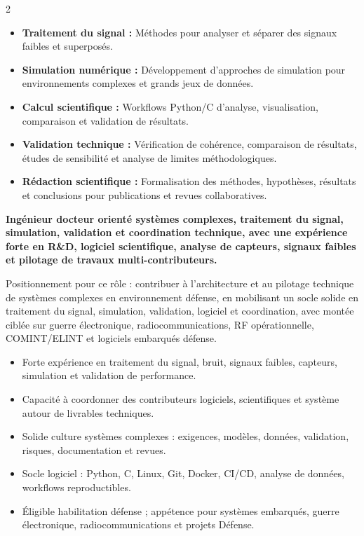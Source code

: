 \documentclass[8pt,a4paper,ragged2e,withhyper]{altacv}
\begin{document}
\begin{paracol}{2}
\begin{itemize}
  \item \textbf{Traitement du signal :} Méthodes pour analyser et séparer des signaux faibles et superposés.
  \item \textbf{Simulation numérique :} Développement d’approches de simulation pour environnements complexes et grands jeux de données.
  \item \textbf{Calcul scientifique :} Workflows Python/C d’analyse, visualisation, comparaison et validation de résultats.
  \item \textbf{Validation technique :} Vérification de cohérence, comparaison de résultats, études de sensibilité et analyse de limites méthodologiques.
  \item \textbf{Rédaction scientifique :} Formalisation des méthodes, hypothèses, résultats et conclusions pour publications et revues collaboratives.
\end{itemize}

\switchcolumn


\textbf{Ingénieur docteur orienté systèmes complexes, traitement du signal, simulation, validation et coordination technique, avec une expérience forte en R\&D, logiciel scientifique, analyse de capteurs, signaux faibles et pilotage de travaux multi-contributeurs.}

Positionnement pour ce rôle : contribuer à l’architecture et au pilotage technique de systèmes complexes en environnement défense, en mobilisant un socle solide en traitement du signal, simulation, validation, logiciel et coordination, avec montée ciblée sur guerre électronique, radiocommunications, RF opérationnelle, COMINT/ELINT et logiciels embarqués défense.

\begin{itemize}
  \item Forte expérience en traitement du signal, bruit, signaux faibles, capteurs, simulation et validation de performance.
  \item Capacité à coordonner des contributeurs logiciels, scientifiques et système autour de livrables techniques.
  \item Solide culture systèmes complexes : exigences, modèles, données, validation, risques, documentation et revues.
  \item Socle logiciel : Python, C, Linux, Git, Docker, CI/CD, analyse de données, workflows reproductibles.
  \item Éligible habilitation défense ; appétence pour systèmes embarqués, guerre électronique, radiocommunications et projets Défense.
\end{itemize}


\end{paracol}
\end{document}
